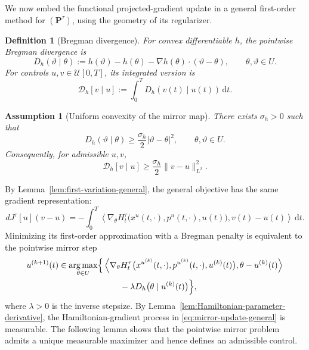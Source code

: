 \documentclass[11pt]{amsart}
\numberwithin{equation}{section} %
\DeclareMathOperator*{\argmax}{arg\,max}
\newcommand{\dd}{\mathrm{d}}
\newtheorem{definition}{Definition}[section]
\newtheorem{assumption}{Assumption}[section]
\theoremstyle{remark}
\begin{document}
We now embed the functional projected-gradient update in a general first-order
method for $(\mathbf P^\tau)$, using the geometry of its regularizer.

\begin{definition}[Bregman divergence]
\label{def:bregman-divergence}
For convex differentiable $h$, the pointwise Bregman divergence is
\begin{equation}
\label{eq:bregman-divergence}
D_h(\vartheta\mid\theta):=
h(\vartheta)-h(\theta)-\nabla h(\theta)\cdot(\vartheta-\theta),
\qquad\theta,\vartheta\in U.
\end{equation}
For controls $u,v\in\mathcal U[0,T]$, its integrated version is
\begin{equation}
\label{eq:integrated-bregman-divergence}
\mathcal D_h[v\mid u]:=\int_0^T D_h(v(t)\mid u(t))\,\dd t.
\end{equation}
\end{definition}

\begin{assumption}[Uniform convexity of the mirror map]
\label{ass:mirror-map}
There exists $\sigma_h>0$ such that
\begin{equation}
\label{eq:uniform-convexity-h}
D_h(\vartheta\mid\theta)\ge\frac{\sigma_h}{2}|\vartheta-\theta|^2,
\qquad\theta,\vartheta\in U.
\end{equation}
Consequently, for admissible $u,v$,
\begin{equation}
\label{eq:integrated-uniform-convexity}
\mathcal D_h[v\mid u]\ge\frac{\sigma_h}{2}\|v-u\|_{L^2}^2.
\end{equation}
\end{assumption}

By Lemma~\ref{lem:first-variation-general}, the general objective has
the same gradient representation:
\begin{equation}
\label{eq:first-variation-Jtau}
dJ^\tau[u](v-u)
=
-\int_0^T
\left\langle
\nabla_\theta H_t^\tau
\bigl(x^u(t,\cdot),p^u(t,\cdot),u(t)\bigr),
v(t)-u(t)
\right\rangle
\,\dd t.
\end{equation}
Minimizing its first-order approximation with a Bregman penalty is
equivalent to the pointwise mirror step
\begin{equation}
\label{eq:mirror-update-general}
\begin{aligned}
u^{(k+1)}(t)\in\argmax_{\theta\in U}\Bigl\{&
\left\langle
\nabla_\theta H_t^\tau
\bigl(
x^{u^{(k)}}(t,\cdot),
p^{u^{(k)}}(t,\cdot),
u^{(k)}(t)
\bigr),
\theta-u^{(k)}(t)
\right\rangle
\\
&\qquad
-\lambda D_h\bigl(\theta\mid u^{(k)}(t)\bigr)
\Bigr\},
\end{aligned}
\end{equation}
where $\lambda>0$ is the inverse stepsize.
By Lemma~\ref{lem:Hamiltonian-parameter-derivative}, the
Hamiltonian-gradient process in \eqref{eq:mirror-update-general} is
measurable. The following lemma shows that the pointwise mirror
problem admits a unique measurable maximizer and hence defines an
admissible control.
\end{document}
